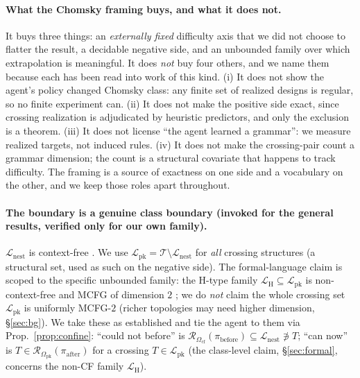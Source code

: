 \documentclass[11pt]{article}
\newcommand{\NESTED}{\ensuremath{\mathcal{L}_{\mathrm{nest}}}}
\newcommand{\PK}{\ensuremath{\mathcal{L}_{\mathrm{pk}}}}
\newcommand{\Ocf}{\ensuremath{\Omega_{\mathrm{cf}}}}
\newcommand{\Opk}{\ensuremath{\Omega_{\mathrm{pk}}}}
\newcommand{\Rze}[2]{\ensuremath{\mathcal{R}_{#1}(#2)}}
\begin{document}
\paragraph{What the Chomsky framing buys, and what it does not.} It buys three things: an
\emph{externally fixed} difficulty axis that we did not choose to flatter the result, a decidable negative
side, and an unbounded family over which extrapolation is meaningful. It does \emph{not} buy four others, and
we name them because each has been read into work of this kind. (i) It does not show the agent's policy
changed Chomsky class: any finite set of realized designs is regular, so no finite experiment can. (ii) It
does not make the positive side exact, since crossing realization is adjudicated by heuristic predictors, and only
the exclusion is a theorem. (iii) It does not license ``the agent learned a grammar'': we measure realized
targets, not induced rules. (iv) It does not make the crossing-pair count a grammar dimension; the count is a
structural covariate that happens to track difficulty. The framing is a source of exactness on one side and a
vocabulary on the other, and we keep those roles apart throughout.

\paragraph{The boundary is a genuine class boundary (invoked for the general results, verified only for our
own family).} $\NESTED$ is context-free
\citep{rivaseddy2000,durbin1998}. We use $\PK=\mathcal T\setminus\NESTED$ for \emph{all} crossing structures
(a structural set, used as such on the negative side). The formal-language claim is scoped to the specific
unbounded family: the H-type family $\mathcal L_{\mathrm H}\subseteq\PK$ is non-context-free
\citep{nebelweinberg} and MCFG of dimension $2$ \citep{rivaseddy2000,katosekikasami2006}; we do \emph{not}
claim the whole crossing set $\PK$ is uniformly MCFG-$2$ (richer topologies may need higher dimension,
\S\ref{sec:bg}). We take these as established and tie the agent to them via Prop.~\ref{prop:confine}:
``could not before'' is $\Rze{\Ocf}{\pi_{\mathrm{before}}}\subseteq\NESTED\not\ni T$; ``can now'' is
$T\in\Rze{\Opk}{\pi_{\mathrm{after}}}$ for a crossing $T\in\PK$ (the class-level claim, \S\ref{sec:formal},
concerns the non-CF family $\mathcal L_{\mathrm H}$).
\end{document}
